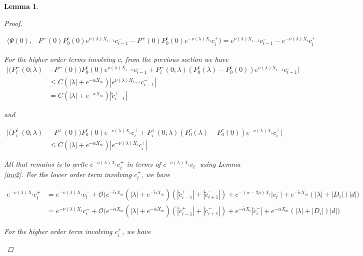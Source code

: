 \documentclass[12pt]{article}
\newtheorem{lemma}{Lemma}
\begin{document}
\begin{lemma}
\begin{proof}
\begin{enumerate}
\begin{align*}
\langle \Psi(0), &P^-(0) P_0^c(0) e^{\nu(\lambda) X_{i-1}} c_{i-1}^- - P^+(0) P_0^c(0) e^{-\nu(\lambda)X_i} c_i^+) = e^{\nu(\lambda) X_{i-1}} c_{i-1}^- - e^{-\nu(\lambda)X_i} c_i^+ 
\end{align*}

For the higher order terms involving $c$, from the previous section we have
\begin{align*}
|(P_i^-(0; \lambda) &- P^-(0)) P_0^c(0) e^{\nu(\lambda) X_{i-1}} c_{i-1}^- + P_i^-(0; \lambda) (P_0^c(\lambda) - P_0^c(0)) e^{\nu(\lambda) X_{i-1}} c_{i-1}^-| \\
&\leq C (|\lambda| + e^{-\alpha X_m}) |e^{\nu(\lambda) X_{i-1}} c_{i-1}^-|\\
&= C (|\lambda| + e^{-\alpha X_m}) |\tilde{c}_{i-1}^+|
\end{align*}

and

\begin{align*}
|(P_i^+(0; \lambda) &- P^+(0))P_0^c(0) e^{-\nu(\lambda)X_i} c_i^+ + P_i^+(0; \lambda) (P_0^c(\lambda) - P_0^c(0)) e^{-\nu(\lambda)X_i} c_i^+| \\
&\leq C (|\lambda| + e^{-\alpha X_m}) |e^{-\nu(\lambda)X_i} c_i^+|
\end{align*}

All that remains is to write $e^{-\nu(\lambda)X_i} c_i^+$ in terms of $e^{-\nu(\lambda)X_i} c_i^-$ using Lemma \ref{inv2}. For the lower order term involving $c_i^+$, we have

\begin{align*}
e^{-\nu(\lambda)X_i} c_i^+ &= e^{-\nu(\lambda)X_i} c_i^- 
+ \mathcal{O}\Big( e^{-\tilde{\alpha}X_m} (|\lambda| + e^{-\tilde{\alpha}X_m})( |\tilde{c}_{i-1}^+| + |\tilde{c}_{i+1}^-|) 
+ e^{-(\alpha - 2 \rho) X_i}|c_i^-| +  e^{-\tilde{\alpha}X_m}(|\lambda| + |D_i|)|d| \Big) \\
&= e^{-\nu(\lambda)X_i} c_i^- 
+ \mathcal{O}\Big( e^{-\tilde{\alpha}X_m} (|\lambda| + e^{-\tilde{\alpha}X_m})( |\tilde{c}_{i-1}^+| + |\tilde{c}_{i+1}^-|) 
+ e^{-\tilde{\alpha}X_i}|\tilde{c}_i^-| + e^{-\tilde{\alpha}X_m}(|\lambda| + |D_i|)|d| \Big)
\end{align*}

For the higher order term involving $c_i^+$, we have


\end{enumerate}
\end{proof}
\end{lemma}
\end{document}

